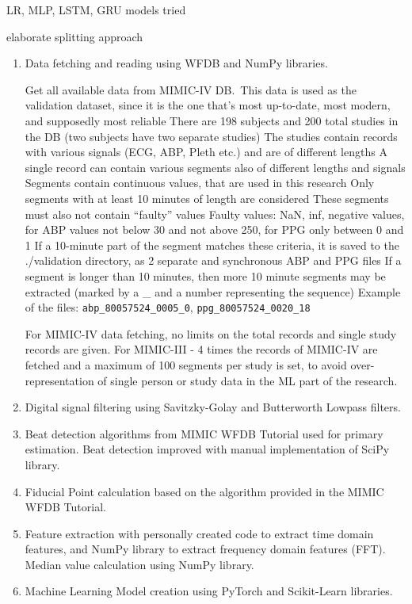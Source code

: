 LR, MLP, LSTM, GRU models tried

elaborate splitting approach

\begin{enumerate}

    \item Data fetching and reading using WFDB and NumPy libraries.

    \subitem Get all available data from MIMIC-IV DB.\
    \subitem This data is used as the validation dataset, since it is the one that's most up-to-date,
    most modern, and supposedly most reliable
    \subitem There are 198 subjects and 200 total studies in the DB (two subjects have two separate studies)
    \subitem The studies contain records with various signals (ECG, ABP, Pleth etc.) and are of different lengths
    \subitem A single record can contain various segments also of different lengths and signals
    \subitem Segments contain continuous values, that are used in this research
    \subitem Only segments with at least 10 minutes of length are considered
    \subitem These segments must also not contain \enquote{faulty} values
    \subitem Faulty values: NaN, inf, negative values, for ABP values not below 30 and not above 250,
    for PPG only between 0 and 1
    \subitem If a 10-minute part of the segment matches these criteria, it is saved to the ./validation directory,
    as 2 separate and synchronous ABP and PPG files
    \subitem If a segment is longer than 10 minutes, then more 10 minute segments may be extracted
    (marked by a \_ and a number representing the sequence)
    \subitem Example of the files: \texttt{abp\_80057524\_0005\_0}, \texttt{ppg\_80057524\_0020\_18}

    For MIMIC-IV data fetching, no limits on the total records and single study records are given.
    For MIMIC-III - 4 times the records of MIMIC-IV are fetched and a maximum of 100 segments per study is set,
    to avoid over-representation of single person or study data in the ML part of the research.

    \item Digital signal filtering using Savitzky-Golay and Butterworth Lowpass filters.

    \item Beat detection algorithms from MIMIC WFDB Tutorial used for primary estimation.
    Beat detection improved with manual implementation of SciPy library.

    \item Fiducial Point calculation based on the algorithm provided in the MIMIC WFDB Tutorial.

    \item Feature extraction with personally created code to extract time domain features, and NumPy library to extract frequency domain features (FFT). Median value calculation using NumPy library.

    \item Machine Learning Model creation using PyTorch and Scikit-Learn libraries.

\end{enumerate}
